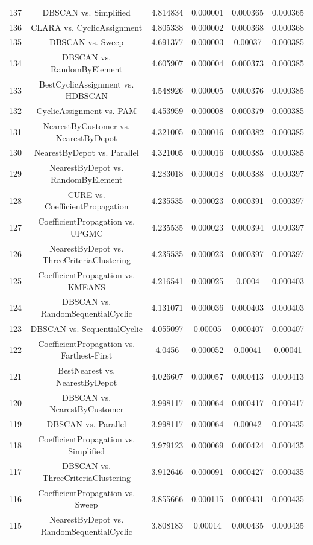 \documentclass[a4paper,10pt]{article}
\begin{document}
\begin{landscape}
\begin{table}[!htp]
\begin{tabular}{cccccc}
137&DBSCAN vs. Simplified&4.814834&0.000001&0.000365&0.000365\\
136&CLARA vs. CyclicAssignment&4.805338&0.000002&0.000368&0.000368\\
135&DBSCAN vs. Sweep&4.691377&0.000003&0.00037&0.000385\\
134&DBSCAN vs. RandomByElement&4.605907&0.000004&0.000373&0.000385\\
133&BestCyclicAssignment vs. HDBSCAN&4.548926&0.000005&0.000376&0.000385\\
132&CyclicAssignment vs. PAM&4.453959&0.000008&0.000379&0.000385\\
131&NearestByCustomer vs. NearestByDepot&4.321005&0.000016&0.000382&0.000385\\
130&NearestByDepot vs. Parallel&4.321005&0.000016&0.000385&0.000385\\
129&NearestByDepot vs. RandomByElement&4.283018&0.000018&0.000388&0.000397\\
128&CURE vs. CoefficientPropagation&4.235535&0.000023&0.000391&0.000397\\
127&CoefficientPropagation vs. UPGMC&4.235535&0.000023&0.000394&0.000397\\
126&NearestByDepot vs. ThreeCriteriaClustering&4.235535&0.000023&0.000397&0.000397\\
125&CoefficientPropagation vs. KMEANS&4.216541&0.000025&0.0004&0.000403\\
124&DBSCAN vs. RandomSequentialCyclic&4.131071&0.000036&0.000403&0.000403\\
123&DBSCAN vs. SequentialCyclic&4.055097&0.00005&0.000407&0.000407\\
122&CoefficientPropagation vs. Farthest-First&4.0456&0.000052&0.00041&0.00041\\
121&BestNearest vs. NearestByDepot&4.026607&0.000057&0.000413&0.000413\\
120&DBSCAN vs. NearestByCustomer&3.998117&0.000064&0.000417&0.000417\\
119&DBSCAN vs. Parallel&3.998117&0.000064&0.00042&0.000435\\
118&CoefficientPropagation vs. Simplified&3.979123&0.000069&0.000424&0.000435\\
117&DBSCAN vs. ThreeCriteriaClustering&3.912646&0.000091&0.000427&0.000435\\
116&CoefficientPropagation vs. Sweep&3.855666&0.000115&0.000431&0.000435\\
115&NearestByDepot vs. RandomSequentialCyclic&3.808183&0.00014&0.000435&0.000435\\

\end{tabular}
\end{table}
\end{landscape}
\end{document}
